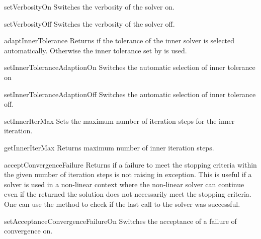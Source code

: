 \begin{methoddesc}[SolverOptions]{setVerbosityOn}{}
Switches the verbosity of the solver on.
\end{methoddesc}


\begin{methoddesc}[SolverOptions]{setVerbosityOff}{}
Switches the verbosity of the solver off.
\end{methoddesc}


\begin{methoddesc}[SolverOptions]{adaptInnerTolerance}{}
Returns \True if the tolerance of the inner solver is selected automatically. 
Otherwise the inner tolerance set by  is used.
\end{methoddesc}

\begin{methoddesc}[SolverOptions]{setInnerToleranceAdaptionOn}{}
Switches the automatic selection of inner tolerance on 
\end{methoddesc}

\begin{methoddesc}[SolverOptions]{setInnerToleranceAdaptionOff}{}
Switches the automatic selection of inner tolerance off.
\end{methoddesc}

\begin{methoddesc}[SolverOptions]{setInnerIterMax}{}
Sets the maximum number of iteration steps for the inner iteration.
\end{methoddesc}

\begin{methoddesc}[SolverOptions]{getInnerIterMax}{}
Returns maximum number of inner iteration steps.
\end{methoddesc}

\begin{methoddesc}[SolverOptions]{acceptConvergenceFailure}{}
Returns \True if a failure to meet the stopping criteria within the
given number of iteration steps is not raising in exception. This is useful 
if a solver is used in a non-linear context where the non-linear solver can 
continue even if the returned the solution does not necessarily meet the
stopping criteria. One can use the  method to check if the
last call to the solver was successful.
\end{methoddesc}

\begin{methoddesc}[SolverOptions]{setAcceptanceConvergenceFailureOn}{}
Switches the acceptance of a failure of convergence on.  
\end{methoddesc}

